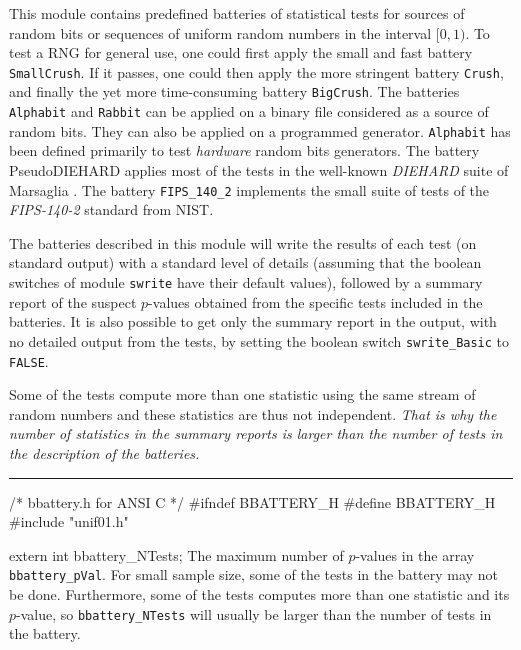 
This module contains predefined batteries of statistical tests for
sources of random bits or sequences of uniform random numbers in
the interval $[0, 1)$.
To test a RNG for general use, one could first apply the
small and fast battery {\tt SmallCrush}.
If it passes, one could then apply the more stringent battery
{\tt Crush}, and finally the yet more time-consuming
battery {\tt BigCrush}.
The batteries {\tt Alphabit} and {\tt Rabbit} can be applied on a binary
file considered as a source of random bits. They can also be applied
on a programmed generator.  {\tt Alphabit} has been defined primarily to test
{\it hardware} random bits generators.
The battery {PseudoDIEHARD} applies most of the tests in
the well-known {\it DIEHARD\/} suite of Marsaglia \cite{rMAR96b}.
The battery {\tt FIPS\_140\_2} implements the small suite of tests
of the {\it FIPS-140-2} standard from NIST.

The batteries described in this module  will write the results of each test
(on standard output) with a standard level of details (assuming that the
 boolean switches of module {\tt swrite} have their default values),
followed by a summary  report of the suspect $p$-values obtained from the
 specific tests included in the batteries.
It is also possible to get only the summary report in the output,
with no detailed output from the tests,
by setting the boolean switch {\tt swrite\_Basic} to {\tt FALSE}.

Some of the tests compute more than one statistic using the same stream of
random numbers and these statistics are thus not independent.
\emph{That is why the number of statistics in the summary reports is larger than
the number of tests in the description of the batteries.}

\bigskip
\hrule
\code\hide
/* bbattery.h for ANSI C */
#ifndef BBATTERY_H
#define BBATTERY_H
\endhide
#include "unif01.h"


extern int bbattery_NTests;
\endcode
  \tab The maximum number of $p$-values in the array {\tt bbattery\_pVal}.
  For small sample size, some of the tests in the battery may not be done.
  Furthermore, some of the tests computes more than one statistic and
  its $p$-value, so {\tt bbattery\_NTests} will usually be larger than
  the number of tests in the battery.
  \endtab
\code


